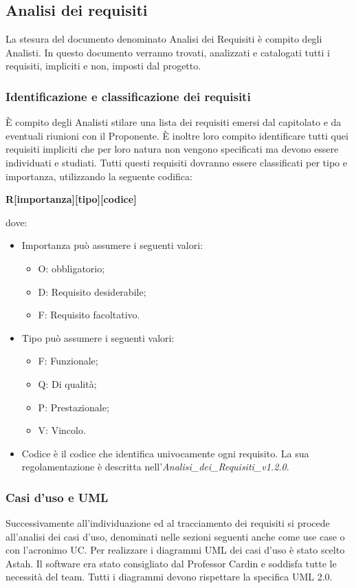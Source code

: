
\subsection{Analisi dei requisiti}
\label{6.1}
La stesura del documento denominato Analisi dei Requisiti è compito degli Analisti.
In questo documento verranno trovati, analizzati e catalogati tutti i requisiti, impliciti e non, imposti dal progetto.

\subsubsection{Identificazione e classificazione dei requisiti}
\label{7.1}
È compito degli Analisti stilare una lista dei requisiti emersi dal capitolato e da eventuali riunioni con il Proponente. È inoltre loro compito identificare tutti quei requisiti impliciti che per loro natura non vengono specificati ma devono essere individuati e studiati. Tutti questi requisiti dovranno essere classificati per tipo e importanza, utilizzando la seguente codifica:
\begin{center}
\textbf{R[importanza][tipo][codice]}
\end{center}
dove:
\begin{itemize}
\item Importanza può assumere i seguenti valori:
\begin{itemize}
\item O:  obbligatorio;
\item D: Requisito desiderabile;
\item F: Requisito facoltativo.
\end{itemize}
\item Tipo può assumere i seguenti valori:
\begin{itemize}
\item F: Funzionale;
\item Q: Di qualità;
\item P: Prestazionale;
\item V: Vincolo.
\end{itemize}
\item Codice è il codice che identifica univocamente ogni requisito. La sua regolamentazione è descritta nell'\emph{Analisi\_dei\_Requisiti\_v1.2.0}.
\end{itemize}

\subsubsection{Casi d’uso e UML}
\label{7.2}
Successivamente all'individuazione ed al tracciamento dei requisiti si procede all'analisi dei casi d'uso, denominati nelle sezioni seguenti anche come use case o con l'acronimo UC.
Per realizzare i diagrammi UML dei casi d'uso è stato scelto Astah. Il software era stato consigliato dal Professor Cardin e soddisfa tutte le necessità del team.
Tutti i diagrammi devono rispettare la specifica UML 2.0.

